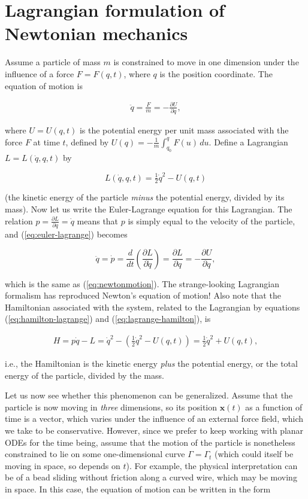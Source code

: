 \documentclass[11pt]{report}
\theoremstyle{plain}
\theoremstyle{definition}
\begin{document}
\section{Lagrangian formulation of Newtonian mechanics}
Assume a particle of mass $m$ is constrained to move
in one dimension under the influence of a force
$F=F(q,t)$, where $q$ is the position coordinate. The
equation of motion is

\begin{equation*} \tag{7}\label{eq:newtonmotion}
\begin{split}
\ddot{q} = \frac{F}{m} = -\frac{\partial U}{\partial q},
\end{split}
\end{equation*}

where $U=U(q,t)$ is the potential energy per unit
mass associated with the force $F$ at time $t$,
defined by $U(q)=-\frac{1}{m}\int_{q_0}^ q F(u)\,du$.
Define a Lagrangian $L=L(\dot{q},q,t)$ by

\[
L(\dot{q},q,t) = \tfrac12 \dot{q}^2 - U(q,t)
\]

(the kinetic energy of the particle \emph{minus} the
potential energy, divided by its mass). Now let us
write the Euler-Lagrange equation for this Lagrangian.
The relation
$p=\frac{\partial L}{\partial q} = \dot{q}$ means
that $p$ is simply equal to the velocity of the
particle, and (\ref{eq:euler-lagrange}) becomes

\[
\ddot{q} = \dot{p} = \frac{d}{dt} \left( \frac{\partial L}{\partial \dot{q}} \right) = \frac{\partial L}{\partial q} = -\frac{\partial U}{\partial q},
\]

which is the same as (\ref{eq:newtonmotion}). The
strange-looking Lagrangian formalism has reproduced
Newton's equation of motion! Also note that the
Hamiltonian associated with the system, related to the
Lagrangian by equations (\ref{eq:hamilton-lagrange}) and
(\ref{eq:lagrange-hamilton}), is

\begin{align*}
H = p \dot{q} - L = \dot{q}^2 - \left( \tfrac12 \dot{q}^2 - U(q,t) \right)
= \tfrac12 \dot{q}^2 + U(q,t),
\end{align*}

i.e., the Hamiltonian is the kinetic energy \emph{plus}
the potential energy, or the total energy of the
particle, divided by the mass.

Let us now see whether this phenomenon can be
generalized. Assume that the particle is now moving in
\emph{three} dimensions, so its position $\mathbf{x}(t)$
as a function of time is a vector, which varies under
the influence of an external force field, which we
take to be conservative. However, since we prefer to
keep working with planar ODEs for the time being,
assume that the motion of the particle is nonetheless
constrained to lie on some one-dimensional curve
$\Gamma=\Gamma_t$ (which could itself be moving in
space, so depends on $t$). For example, the physical
interpretation can be of a bead sliding without
friction along a curved wire, which may be moving in
space. In this case, the equation of motion can be
written in the form
\end{document}
